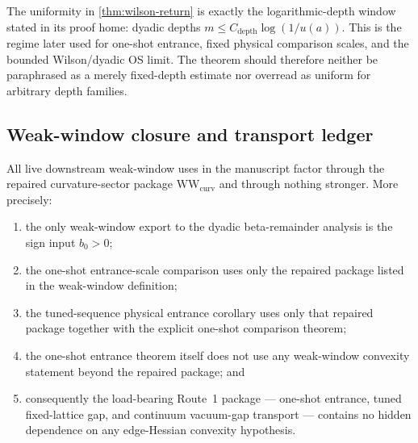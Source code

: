 \begin{remark}
The uniformity in \cref{thm:wilson-return} is exactly the logarithmic-depth window stated in its proof home: dyadic depths $m\le C_{\mathrm{depth}}\log(1/u(a))$. This is the regime later used for one-shot entrance, fixed physical comparison scales, and the bounded Wilson/dyadic OS limit. The theorem should therefore neither be paraphrased as a merely fixed-depth estimate nor overread as uniform for arbitrary depth families.
\end{remark}


\subsection{Weak-window closure and transport ledger}

\begin{theorem}\label{thm:weak-window-certificate}
All live downstream weak-window uses in the manuscript factor through the repaired curvature-sector package $\mathrm{WW}_{\mathrm{curv}}$ and through nothing stronger. More precisely:
\begin{enumerate}[label=\textup{\arabic*.}]
    \item the only weak-window export to the dyadic beta-remainder analysis is the sign input $b_0>0$;
    \item the one-shot entrance-scale comparison uses only the repaired package listed in the weak-window definition;
    \item the tuned-sequence physical entrance corollary uses only that repaired package together with the explicit one-shot comparison theorem;
    \item the one-shot entrance theorem itself does not use any weak-window convexity statement beyond the repaired package; and
    \item consequently the load-bearing Route~1 package --- one-shot entrance, tuned fixed-lattice gap, and continuum vacuum-gap transport --- contains no hidden dependence on any edge-Hessian convexity hypothesis.
\end{enumerate}
\end{theorem}

